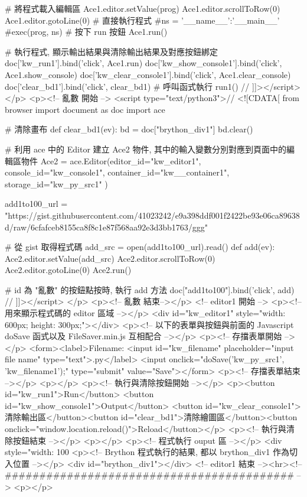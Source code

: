     # 將程式載入編輯區
    Ace1.editor.setValue(prog)
    Ace1.editor.scrollToRow(0)
    Ace1.editor.gotoLine(0)
    # 直接執行程式
    #ns = {'__name__':'__main__'}
    #exec(prog, ns)
    # 按下 run 按鈕
    Ace1.run()

# 執行程式, 顯示輸出結果與清除輸出結果及對應按鈕綁定
doc['kw_run1'].bind('click', Ace1.run)
doc['kw_show_console1'].bind('click', Ace1.show_console)
doc['kw_clear_console1'].bind('click', Ace1.clear_console)
doc['clear_bd1'].bind('click', clear_bd1)
# 呼叫函式執行
run1()
// ]]></script>
</p>
<p><!-- 亂數 開始 -->
<script type="text/python3">// <![CDATA[
from browser import document as doc
import ace

# 清除畫布
def clear_bd1(ev):
    bd = doc["brython_div1"]
    bd.clear()

# 利用 ace 中的 Editor 建立 Ace2 物件, 其中的輸入變數分別對應到頁面中的編輯區物件
Ace2 = ace.Editor(editor_id="kw_editor1", console_id="kw_console1", container_id="kw__container1", storage_id="kw_py_src1" )

add1to100_url = "https://gist.githubusercontent.com/41023242/e9a398ddf001f2422be93e06ca89638d/raw/6cfafceb8155ca8f8c1e87f568aa92e3d3bb1763/ggg"

# 從 gist 取得程式碼
add_src = open(add1to100_url).read()
def add(ev):
    Ace2.editor.setValue(add_src)
    Ace2.editor.scrollToRow(0)
    Ace2.editor.gotoLine(0)
    Ace2.run()

# id 為 "亂數" 的按鈕點按時, 執行 add 方法
doc["add1to100"].bind('click', add)
// ]]></script>
</p>
<p><!-- 亂數 結束--></p>
<!-- editor1 開始 -->
<p><!-- 用來顯示程式碼的 editor 區域 --></p>
<div id="kw_editor1" style="width: 600px; height: 300px;"></div>
<p><!-- 以下的表單與按鈕與前面的 Javascript doSave 函式以及 FileSaver.min.js 互相配合 --></p>
<p><!-- 存擋表單開始 --></p>
<form><label>Filename: <input id="kw_filename" placeholder="input file name" type="text">.py</label> <input onclick="doSave('kw_py_src1', 'kw_filename1');" type="submit" value="Save"></form>
<p><!-- 存擋表單結束 --></p>
<p></p>
<p><!-- 執行與清除按鈕開始 --></p>
<p><button id="kw_run1">Run</button> <button id="kw_show_console1">Output</button> <button id="kw_clear_console1">清除輸出區</button><button id="clear_bd1">清除繪圖區</button><button onclick="window.location.reload()">Reload</button></p>
<p><!-- 執行與清除按鈕結束 --></p>
<p></p>
<p><!-- 程式執行 ouput 區 --></p>
<div style="width: 100%
<p><!-- Brython 程式執行的結果, 都以 brython_div1 作為切入位置 --></p>
<div id="brython_div1"></div>
<!-- editor1 結束 --><hr><!-- ########################################## -->
<p></p>
\newpage
